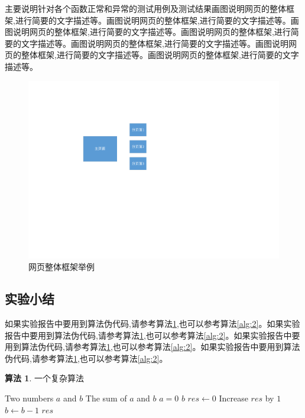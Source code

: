 \documentclass[supercite]{Experimental_Report}
\theoremstyle{definition}
\newtheorem{alg}{算法}[section]
\begin{document}
主要说明针对各个函数正常和异常的测试用例及测试结果画图说明网页的整体框架,进行简要的文字描述等。画图说明网页的整体框架,进行简要的文字描述等。画图说明网页的整体框架,进行简要的文字描述等。画图说明网页的整体框架,进行简要的文字描述等。画图说明网页的整体框架,进行简要的文字描述等。画图说明网页的整体框架,进行简要的文字描述等。画图说明网页的整体框架,进行简要的文字描述等。

\begin{figure}[htb] %
	\begin{center}
		\includegraphics[scale=0.80]{images/1-1.pdf}
		\caption{网页整体框架举例}
		\label{fig3-1}
	\end{center}
\end{figure}

\subsection{实验小结}

如果实验报告中要用到算法伪代码,请参考算法\ref{alg:1},也可以参考算法\ref{alg:2}。如果实验报告中要用到算法伪代码,请参考算法\ref{alg:1},也可以参考算法\ref{alg:2}。如果实验报告中要用到算法伪代码,请参考算法\ref{alg:1},也可以参考算法\ref{alg:2}。如果实验报告中要用到算法伪代码,请参考算法\ref{alg:1},也可以参考算法\ref{alg:2}。

\begin{shaded*}\begin{alg}{一个复杂算法}
		\label{alg:1}
		\begin{algorithmic}
			\Input Two numbers $a$ and $b$
			\Output The sum of $a$ and $b$
			\If $a = 0$
			\State \Return $b$
			\EndIf
			\State $res \gets 0$
			\State Increase $res$ by $1$
			\State $b \gets b - 1$
			\EndWhile
			\State \Return $res$
			\EndProcedure
		\end{algorithmic}
\end{alg}\end{shaded*}
\end{document}
